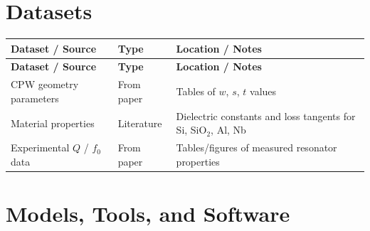 \documentclass[11pt,a4paper]{article}
\begin{document}
\section{Datasets}

\begin{longtable}{p{4.5cm} p{3.5cm} p{6cm}}
\toprule
\textbf{Dataset / Source} & \textbf{Type} & \textbf{Location / Notes} \\
\midrule
\endfirsthead
\toprule
\textbf{Dataset / Source} & \textbf{Type} & \textbf{Location / Notes} \\
\midrule
\endhead
CPW geometry parameters & From paper & Tables of $w$, $s$, $t$ values \\
\midrule
Material properties & Literature & Dielectric constants and loss tangents for Si, SiO$_2$, Al, Nb \\
\midrule
Experimental $Q$ / $f_0$ data & From paper & Tables/figures of measured resonator properties \\
\bottomrule
\end{longtable}

\section{Models, Tools, and Software}
\end{document}

